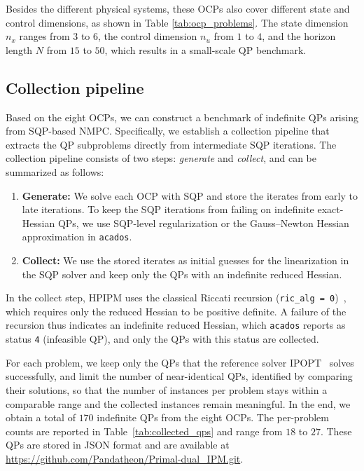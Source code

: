 \documentclass[class=scrbook, crop=false]{standalone}
\begin{document}
Besides the different physical systems,
these \glspl{OCP} also cover different state and control dimensions, 
as shown in Table \ref{tab:ocp_problems}. 
The state dimension $n_x$ ranges from $3$ to $6$, 
the control dimension $n_u$ from $1$ to $4$, and the horizon length $N$ from $15$ to $50$,
which results in a small-scale \gls{QP} benchmark.

\subsection{Collection pipeline}
\label{subsec:collection_pipeline}
Based on the eight \glspl{OCP}, 
we can construct a benchmark of indefinite \glspl{QP} arising from \gls{SQP}-based \gls{NMPC}. 
Specifically, we establish a collection pipeline that extracts the \gls{QP} subproblems directly from intermediate \gls{SQP} iterations.
The collection pipeline consists of two steps: \emph{generate} and \emph{collect}, and can be summarized as follows:

\begin{enumerate}
    \item \textbf{Generate:} We solve each \gls{OCP} with \gls{SQP} and store the iterates from early to late iterations. 
    To keep the \gls{SQP} iterations from failing on indefinite exact-Hessian \glspl{QP}, 
    we use \gls{SQP}-level regularization or the Gauss--Newton Hessian approximation in \texttt{acados}.

    \item \textbf{Collect:} We use the stored iterates as initial guesses for the linearization in the \gls{SQP} solver
    and keep only the \glspl{QP} with an indefinite reduced Hessian.
\end{enumerate}

In the collect step, HPIPM uses the classical Riccati recursion (\texttt{ric\_alg = 0})~\cite{frisonAlgorithmsMethodsHighPerformance},
which requires only the reduced Hessian to be positive definite.
A failure of the recursion thus indicates an indefinite reduced Hessian, which \texttt{acados} reports as status \texttt{4} (infeasible \gls{QP}),
and only the \glspl{QP} with this status are collected.

For each problem, we keep only the \glspl{QP} that the reference solver IPOPT~\cite{wachter2006implementation} solves successfully,
and limit the number of near-identical \glspl{QP}, identified by comparing their solutions,
so that the number of instances per problem stays within a comparable range and the collected instances remain meaningful.
In the end, we obtain a total of $170$ indefinite \glspl{QP} from the eight \glspl{OCP}.
The per-problem counts are reported in Table~\ref{tab:collected_qps} and range from $18$ to $27$.
These \glspl{QP} are stored in JSON format and are available at \url{https://github.com/Pandatheon/Primal-dual_IPM.git}.
\end{document}
